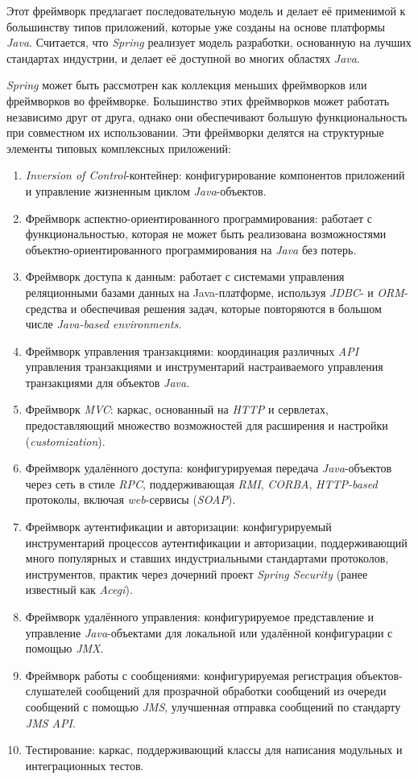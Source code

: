 Этот фреймворк предлагает последовательную модель и делает её применимой к большинству типов приложений, которые уже созданы на основе платформы \textit{Java}. Считается, что \textit{Spring} реализует модель разработки, основанную на лучших стандартах индустрии, и делает её доступной во многих областях \textit{Java}.

\textit{Spring} может быть рассмотрен как коллекция меньших фреймворков или фреймворков во фреймворке. Большинство этих фреймворков может работать независимо друг от друга, однако они обеспечивают большую функциональность при совместном их использовании. Эти фреймворки делятся на структурные элементы типовых комплексных приложений:

\begin{enumerate}
	\item \textit{Inversion of Control}-контейнер: конфигурирование компонентов приложений и управление жизненным циклом \textit{Java}-объектов.
	\item Фреймворк аспектно-ориентированного программирования: работает с функциональностью, которая не может быть реализована возможностями объектно-ориентированного программирования на \textit{Java} без потерь.
	\item Фреймворк доступа к данным: работает с системами управления реляционными базами данных на Java-платформе, используя \textit{JDBC}- и \textit{ORM}-средства и обеспечивая решения задач, которые повторяются в большом числе \textit{Java-based environments}.
	\item Фреймворк управления транзакциями: координация различных \textit{API} управления транзакциями и инструментарий настраиваемого управления транзакциями для объектов \textit{Java}.
	\item Фреймворк \textit{MVC}: каркас, основанный на \textit{HTTP} и сервлетах, предоставляющий множество возможностей для расширения и настройки (\textit{customization}).
	\item Фреймворк удалённого доступа: конфигурируемая передача \textit{Java}-объектов через сеть в стиле \textit{RPC}, поддерживающая \textit{RMI}, \textit{CORBA}, \textit{HTTP-based} протоколы, включая \textit{web}-сервисы (\textit{SOAP}).
	\item Фреймворк аутентификации и авторизации: конфигурируемый инструментарий процессов аутентификации и авторизации, поддерживающий много популярных и ставших индустриальными стандартами протоколов, инструментов, практик через дочерний проект \textit{Spring Security} (ранее известный как \textit{Acegi}).
	\item Фреймворк удалённого управления: конфигурируемое представление и управление \textit{Java}-объектами для локальной или удалённой конфигурации с помощью \textit{JMX}.
	\item Фреймворк работы с сообщениями: конфигурируемая регистрация объектов-слушателей сообщений для прозрачной обработки сообщений из очереди сообщений с помощью \textit{JMS}, улучшенная отправка сообщений по стандарту \textit{JMS API}.
	\item Тестирование: каркас, поддерживающий классы для написания модульных и интеграционных тестов.
\end{enumerate}

